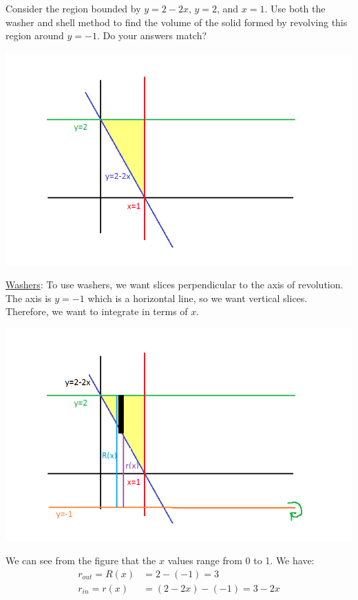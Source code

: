 \documentclass[noinstructornotes]{ximera}
\begin{document}
\begin{problem}
Consider the region bounded by $y=2-2x$, $y=2$, and $x=1$.  Use both the washer and shell method to find the volume of the solid formed by revolving this region around $y=-1$.  Do your answers match?


	\begin{freeResponse}
\begin{image}
\includegraphics{Figure6-4-10.png}
\end{image}

	
\underline{Washers}:  To use washers, we want slices perpendicular to the axis of revolution.  The axis is $y=-1$ which is a horizontal line, so we want vertical slices.  Therefore, we want to integrate in terms of $x$.  

\begin{image}
\includegraphics{Figure6-4-11.png}
\end{image}

We can see from the figure that the $x$ values range from 0 to 1.  We have:
\begin{align*}
r_{out} = R(x) &= 2-(-1) = 3\\
r_{in} = r(x) &= (2 -2x) - (-1) = 3 - 2x
\end{align*}


\end{freeResponse}
\end{problem}
\end{document}
